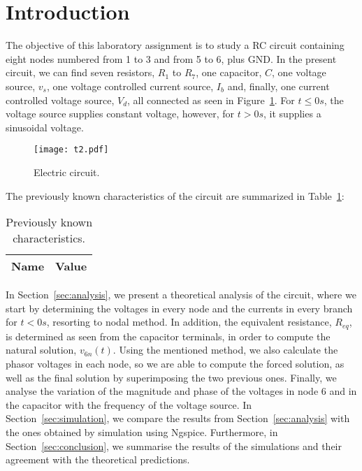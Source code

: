 \section{Introduction}
\label{sec:introduction}

The objective of this laboratory assignment is to study a RC circuit containing eight nodes numbered from 1 to 3 and from 5 to 6, plus GND. In the present circuit, we can find seven resistors, $R_1$ to $R_7$, one capacitor, $C$, one voltage source, $v_s$, one voltage controlled current source, $I_b$ and, finally, one current controlled voltage source, $V_d$, all connected as seen in Figure~\ref{fig:t1}. For $t \leq 0s$, the voltage source supplies constant voltage, however, for $t > 0s$, it supplies a sinusoidal voltage.

\begin{figure}[H] \centering
\texttt{[image: t2.pdf]}
\caption{Electric circuit.}
\label{fig:t1}
\end{figure}

The previously known characteristics of the circuit are summarized in Table~\ref{tab:datatab}:

\begin{table}[H]
  \centering
  \begin{tabular}{|l|r|}
    \hline    
    {\bf Name} & {\bf Value} \\ \hline
    
  \end{tabular}
  \caption{Previously known characteristics.}
  \label{tab:datatab}
\end{table}

In Section~\ref{sec:analysis}, we present a theoretical analysis of the circuit, where we start by determining the voltages in every node and the currents in every branch for $t<0s$, resorting to nodal method. In addition, the equivalent resistance, $R_{eq}$, is determined as seen from the capacitor terminals, in order to compute the natural solution, $v_{6n}(t)$. Using the mentioned method, we also calculate the phasor voltages in each node, so we are able to compute the forced solution, as well as the final solution by superimposing the two previous ones. Finally, we analyse the variation of the magnitude and phase of the voltages in node 6 and in the capacitor with the frequency of the voltage source. In Section~\ref{sec:simulation}, we compare the results from Section~\ref{sec:analysis} with the ones obtained by simulation using Ngspice. Furthermore, in Section~\ref{sec:conclusion}, we summarise the results of the simulations and their agreement with the theoretical predictions.
